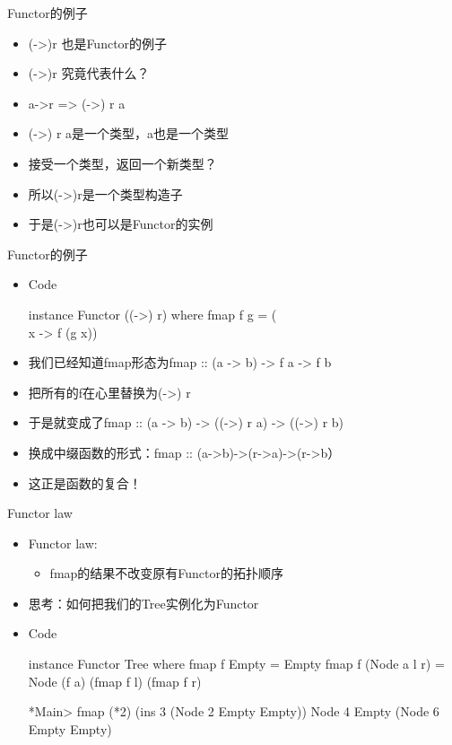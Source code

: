 \documentclass[xcolor=dvipsnames, 11pt]{beamer}
\newenvironment{code}{\begin{block}{Code}\begin{semiverbatim} \begin{footnotesize}}{\end{footnotesize}\end{semiverbatim}\end{block}}
\newenvironment{iit}{\begin{itemize}\setlength{\itemsep}{0.2cm}}{\end{itemize}}
\begin{document}
\begin{frame}[fragile]{Functor的例子}
\begin{iit}
\item<2->(->)r 也是Functor的例子
\item<3->(->)r 究竟代表什么？
\item<4->a->r => (->) r a
\item<5->(->) r a是一个类型，a也是一个类型
\item<6->接受一个类型，返回一个新类型？
\item<7->所以(->)r是一个类型构造子
\item<8->于是(->)r也可以是Functor的实例
\end{iit}
\end{frame}

\begin{frame}[fragile]{Functor的例子}
\begin{iit}
\item<2->[]\begin{code}
instance Functor ((->) r) where   
    fmap f g = (\\x -> f (g x))
\end{code}
\item<3->我们已经知道fmap形态为fmap :: (a -> b) -> f a -> f b
\item<4->把所有的f在心里替换为(->) r
\item<5->于是就变成了fmap :: (a -> b) -> ((->) r a) -> ((->) r b)
\item<6->换成中缀函数的形式：fmap :: (a->b)->(r->a)->(r->b）
\item<7->这正是函数的复合！
\end{iit}
\end{frame}

\begin{frame}[fragile]{Functor law}
\begin{iit}
\item<2->Functor law:
\begin{iit}
\item<3->\Large{fmap的结果不改变原有Functor的拓扑顺序}
\end{iit}
\item<4->思考：如何把我们的Tree实例化为Functor
\item<5->[]\begin{code}
instance Functor Tree where
    fmap f Empty = Empty
    fmap f (Node a l r) = Node (f a) (fmap f l) (fmap f r)

*Main> fmap (*2) (ins 3 (Node 2 Empty Empty))
Node 4 Empty (Node 6 Empty Empty)
\end{code}
\end{iit}
\end{frame}
\end{document}
